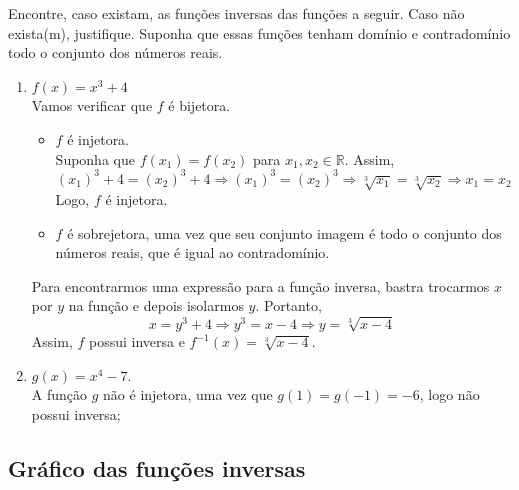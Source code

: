 \begin{exer}
	Encontre, caso existam, as funções inversas das funções a seguir. Caso não exista(m), justifique. Suponha que essas funções tenham domínio e contradomínio todo o conjunto dos números reais.
	\begin{enumerate}
		\item $f(x)=x^3+4$ \\
		\color{red}
		Vamos verificar que $f$ é bijetora.
		\begin{itemize}
		    \item[1.] $f$ é injetora. \\
		    Suponha que $f(x_1)=f(x_2)$ para $x_1, x_2 \in \mathbb{R}$. Assim,  $$(x_1)^3+4=(x_2)^3+4 \Longrightarrow (x_1)^3=(x_2)^3 \Longrightarrow \sqrt[3]{x_1}= \sqrt[3]{x_2} \Longrightarrow x_1=x_2$$
		 Logo, $f$ é injetora.
		 \item[2.] $f$ é sobrejetora, uma vez que seu conjunto imagem é todo o conjunto dos números reais, que é igual ao contradomínio.
		\end{itemize}
		Para encontrarmos uma expressão para a função inversa, bastra trocarmos $x$ por $y$ na função e depois isolarmos $y$. Portanto,
		$$x=y^3+4 \Longrightarrow y^3=x-4 \Longrightarrow y= \sqrt[3]{x-4}$$
		Assim, $f$ possui inversa e $f^{-1}(x)=\sqrt[3]{x-4}$.
		\color{black}
		\item $g(x)=x^4-7$. \\
		\color{red} A função $g$ não é injetora, uma vez que $g(1)=g(-1)=-6$, logo não possui inversa;
		\color{black}
	\end{enumerate}
\end{exer}

\subsection{Gráfico das funções inversas}


%
%




